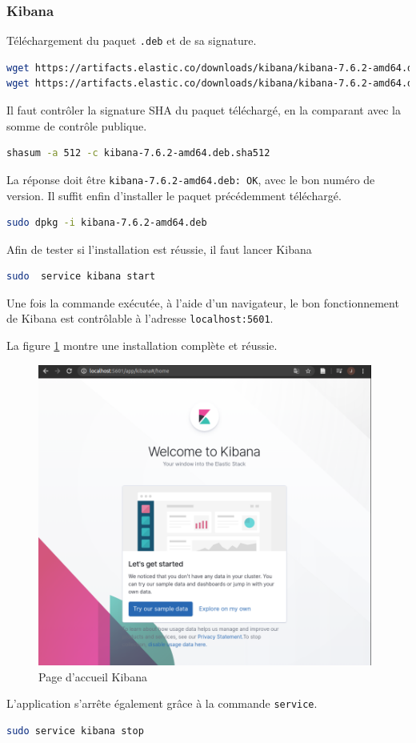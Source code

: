\documentclass[paper=a4, fontsize=11pt]{scrartcl}
\begin{document}
\subsubsection{Kibana}
Téléchargement du paquet \verb,.deb, et de sa signature.
\begin{lstlisting}[language=bash]
wget https://artifacts.elastic.co/downloads/kibana/kibana-7.6.2-amd64.deb
wget https://artifacts.elastic.co/downloads/kibana/kibana-7.6.2-amd64.deb.sha512
\end{lstlisting}
Il faut contrôler la signature SHA du paquet téléchargé, en la comparant avec la somme de contrôle publique.
\begin{lstlisting}[language=bash]
shasum -a 512 -c kibana-7.6.2-amd64.deb.sha512
\end{lstlisting}
La réponse doit être \verb,kibana-7.6.2-amd64.deb: OK,, avec le bon numéro de version.
Il suffit enfin d'installer le paquet précédemment téléchargé.
\begin{lstlisting}[language=bash]
sudo dpkg -i kibana-7.6.2-amd64.deb
\end{lstlisting}
Afin de tester si l'installation est réussie, il faut lancer Kibana
\begin{lstlisting}[language=bash]
sudo  service kibana start
\end{lstlisting}
Une fois la commande exécutée, à l'aide d'un navigateur, le bon fonctionnement de Kibana est contrôlable à l'adresse \verb,localhost:5601,.

La figure \ref{f-kibanaInstalled} montre une installation complète et réussie.
\begin{figure}[H]
    \centering
    \includegraphics[width=11cm]{img/screenshots/kibana_installed.png}
    \caption{Page d'accueil Kibana}
    \label{f-kibanaInstalled}
\end{figure}
L'application s'arrête également grâce à la commande \verb,service,.
\begin{lstlisting}[language=bash]
sudo service kibana stop
\end{lstlisting}
\end{document}
